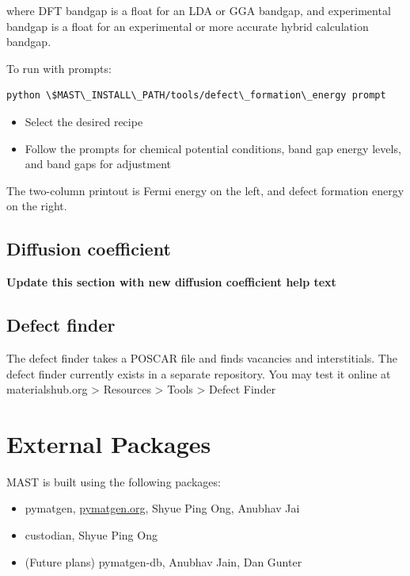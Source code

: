 \documentclass[letterpaper,10pt,english]{sphinxmanual}
\begin{document}
where DFT bandgap is a float for an LDA or GGA bandgap, and experimental bandgap is a float for an experimental or more accurate hybrid calculation bandgap.

To run with prompts:

\begin{Verbatim}[commandchars=\\\{\}]
python \$MAST\_INSTALL\_PATH/tools/defect\_formation\_energy prompt
\end{Verbatim}
\begin{itemize}
\item {} 
Select the desired recipe

\item {} 
Follow the prompts for chemical potential conditions, band gap energy levels, and band gaps for adjustment

\end{itemize}

The two-column printout is Fermi energy on the left, and defect formation energy on the right.


\section{Diffusion coefficient}
\label{6_0_tools:diffusion-coefficient}
\textbf{Update this section with new diffusion coefficient help text}


\section{Defect finder}
\label{6_0_tools:defect-finder}
The defect finder takes a POSCAR file and finds vacancies and interstitials.
The defect finder currently exists in a separate repository.
You may test it online at materialshub.org \textgreater{} Resources \textgreater{} Tools \textgreater{} Defect Finder


\chapter{External Packages}
\label{7_0_externalpackages:external-packages}\label{7_0_externalpackages::doc}
MAST is built using the following packages:
\begin{itemize}
\item {} 
pymatgen, \href{http://pymatgen.org}{pymatgen.org}, Shyue Ping Ong, Anubhav Jai

\item {} 
custodian, Shyue Ping Ong

\item {} 
(Future plans) pymatgen-db, Anubhav Jain, Dan Gunter

\end{itemize}
\end{document}

